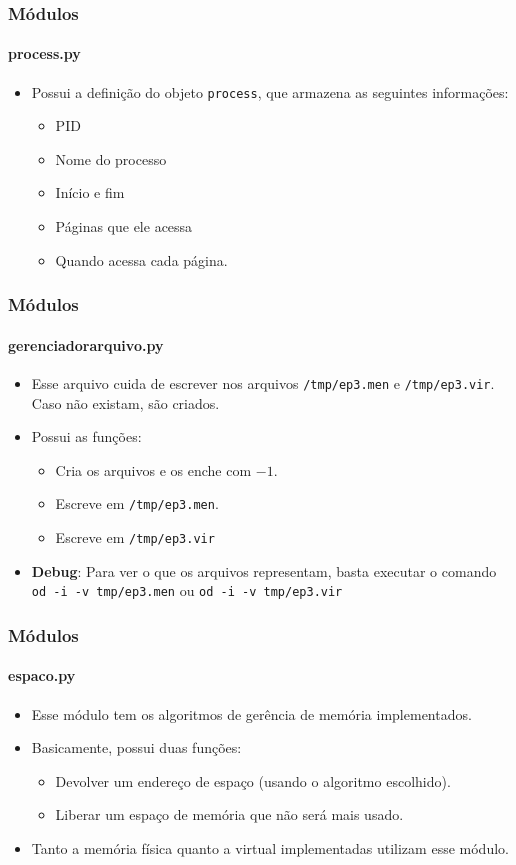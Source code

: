 \documentclass{beamer}
\begin{document}
\begin{frame}
	\frametitle{Módulos}
	\framesubtitle{process.py}
	\begin{itemize}
		\item Possui a definição do objeto \texttt{process}, que armazena as seguintes informações:
		\begin{itemize}
			\item PID
			\item Nome do processo
			\item Início e fim
			\item Páginas que ele acessa
			\item Quando acessa cada página.
		\end{itemize}
	\end{itemize}
\end{frame}

\begin{frame}
	\frametitle{Módulos}
	\framesubtitle{gerenciador\textunderscore arquivo.py}
	\begin{itemize}
		\item Esse arquivo cuida de escrever nos arquivos \texttt{/tmp/ep3.men} e \texttt{/tmp/ep3.vir}. Caso não existam, são criados.
		\item Possui as funções:
		\begin{itemize}
			\item Cria os arquivos e os enche com $-1$.
			\item Escreve em \texttt{/tmp/ep3.men}.
			\item Escreve em \texttt{/tmp/ep3.vir}
		\end{itemize}
		\item \textbf{Debug}: Para ver o que os arquivos representam, basta executar o comando \texttt{od -i -v tmp/ep3.men} ou \texttt{od -i -v tmp/ep3.vir} 
	\end{itemize}
\end{frame}

\begin{frame}
	\frametitle{Módulos}
	\framesubtitle{espaco.py}
	\begin{itemize}
		\item Esse módulo tem os algoritmos de gerência de memória implementados.
		\item Basicamente, possui duas funções:
		\begin{itemize}
			\item Devolver um endereço de espaço (usando o algoritmo escolhido).
			\item Liberar um espaço de memória que não será mais usado.
		\end{itemize}
		\item Tanto a memória física quanto a virtual implementadas utilizam esse módulo.
	\end{itemize}
\end{frame}
\end{document}
